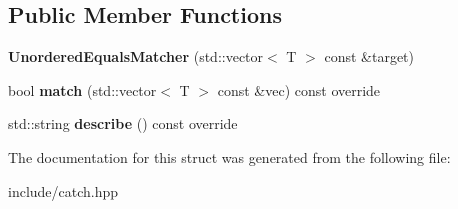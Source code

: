 \subsection*{Public Member Functions}
\begin{DoxyCompactItemize}
\item 
{\bfseries Unordered\+Equals\+Matcher} (std\+::vector$<$ T $>$ const \&target)\hypertarget{structCatch_1_1Matchers_1_1Vector_1_1UnorderedEqualsMatcher_a525905639b2b15b52ddb0bf14bfa19da}{}\label{structCatch_1_1Matchers_1_1Vector_1_1UnorderedEqualsMatcher_a525905639b2b15b52ddb0bf14bfa19da}

\item 
bool {\bfseries match} (std\+::vector$<$ T $>$ const \&vec) const override\hypertarget{structCatch_1_1Matchers_1_1Vector_1_1UnorderedEqualsMatcher_a3ccdd9dd2cd8bdbb8bb121acbb9cb358}{}\label{structCatch_1_1Matchers_1_1Vector_1_1UnorderedEqualsMatcher_a3ccdd9dd2cd8bdbb8bb121acbb9cb358}

\item 
std\+::string {\bfseries describe} () const override\hypertarget{structCatch_1_1Matchers_1_1Vector_1_1UnorderedEqualsMatcher_a7202d811200317abc58c844f663823df}{}\label{structCatch_1_1Matchers_1_1Vector_1_1UnorderedEqualsMatcher_a7202d811200317abc58c844f663823df}

\end{DoxyCompactItemize}


The documentation for this struct was generated from the following file\+:\begin{DoxyCompactItemize}
\item 
include/catch.\+hpp\end{DoxyCompactItemize}
